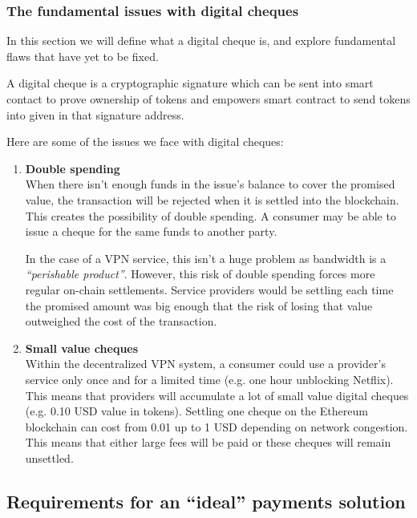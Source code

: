 \documentclass[a4paper,12pt]{article}
\begin{document}
\subsubsection{The fundamental issues with digital cheques}

In this section we will define what a digital cheque is, and explore fundamental
flaws that have yet to be fixed. 

A digital cheque is a cryptographic signature which can be sent into smart contact 
to prove ownership of tokens and empowers smart contract to send tokens into given 
in that signature address.

Here are some of the issues we face with digital cheques: 

\begin{enumerate}
    \item \textbf{Double spending}\\
    When there isn’t enough funds in the issue’s balance to cover the promised 
    value, the transaction will be rejected when it is settled into the blockchain. 
    This creates the possibility of double spending. A consumer may be able to 
    issue a cheque for the same funds to another party. 

    In the case of a VPN service, this isn’t a huge problem as bandwidth is a 
    \textit{“perishable product”}. However, this risk of double spending forces 
    more regular on-chain settlements. Service providers would be settling each 
    time the promised amount was big enough that the risk of losing that value 
    outweighed the cost of the transaction. 

    \item \textbf{Small value cheques}\\
    Within the decentralized VPN system, a consumer could use a provider’s service 
    only once and for a limited time (e.g. one hour unblocking Netflix). This means 
    that providers will accumulate a lot of small value digital cheques (e.g. 0.10 
    USD value in tokens). Settling one cheque on the Ethereum blockchain can cost 
    from 0.01 up to 1 USD depending on network congestion. This means that either 
    large fees will be paid or these cheques will remain unsettled.
\end{enumerate}

\subsection{Requirements for an “ideal” payments solution}
\end{document}
